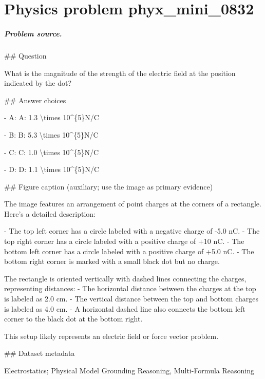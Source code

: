 
\chapter{Physics problem phyx\_mini\_0832}
\label{ch:PhyXMiniProblems_problem_phyx_mini_0832}

\paragraph{Problem source.}
\#\# Question

What is the magnitude of the strength of the electric field at the position indicated by the dot?

\#\# Answer choices

- A: A: 1.3 \textbackslash{}times 10\textasciicircum{}\{5\}N/C

- B: B: 5.3 \textbackslash{}times 10\textasciicircum{}\{5\}N/C

- C: C: 1.0 \textbackslash{}times 10\textasciicircum{}\{5\}N/C

- D: D: 1.1 \textbackslash{}times 10\textasciicircum{}\{5\}N/C

\#\# Figure caption (auxiliary; use the image as primary evidence)

The image features an arrangement of point charges at the corners of a rectangle. Here's a detailed description:

- The top left corner has a circle labeled with a negative charge of -5.0 nC.
- The top right corner has a circle labeled with a positive charge of +10 nC.
- The bottom left corner has a circle labeled with a positive charge of +5.0 nC.
- The bottom right corner is marked with a small black dot but no charge.

The rectangle is oriented vertically with dashed lines connecting the charges, representing distances:
- The horizontal distance between the charges at the top is labeled as 2.0 cm.
- The vertical distance between the top and bottom charges is labeled as 4.0 cm.
- A horizontal dashed line also connects the bottom left corner to the black dot at the bottom right.

This setup likely represents an electric field or force vector problem.

\#\# Dataset metadata

Electrostatics; Physical Model Grounding Reasoning, Multi-Formula Reasoning

